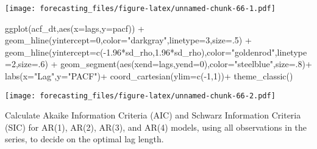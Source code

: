 \documentclass[
  oneside]{book}
\newenvironment{Shaded}{\begin{snugshade}}{\end{snugshade}}
\newcommand{\AttributeTok}[1]{\textcolor[rgb]{0.77,0.63,0.00}{#1}}
\newcommand{\DecValTok}[1]{\textcolor[rgb]{0.00,0.00,0.81}{#1}}
\newcommand{\FloatTok}[1]{\textcolor[rgb]{0.00,0.00,0.81}{#1}}
\newcommand{\FunctionTok}[1]{\textcolor[rgb]{0.00,0.00,0.00}{#1}}
\newcommand{\NormalTok}[1]{#1}
\newcommand{\SpecialCharTok}[1]{\textcolor[rgb]{0.00,0.00,0.00}{#1}}
\newcommand{\StringTok}[1]{\textcolor[rgb]{0.31,0.60,0.02}{#1}}
\begin{document}
\texttt{[image: forecasting\_files/figure-latex/unnamed-chunk-66-1.pdf]}

\begin{Shaded}
\begin{Highlighting}[]
\FunctionTok{ggplot}\NormalTok{(acf\_dt,}\FunctionTok{aes}\NormalTok{(}\AttributeTok{x=}\NormalTok{lags,}\AttributeTok{y=}\NormalTok{pacf)) }\SpecialCharTok{+}
  \FunctionTok{geom\_hline}\NormalTok{(}\AttributeTok{yintercept=}\DecValTok{0}\NormalTok{,}\AttributeTok{color=}\StringTok{"darkgray"}\NormalTok{,}\AttributeTok{linetype=}\DecValTok{3}\NormalTok{,}\AttributeTok{size=}\NormalTok{.}\DecValTok{5}\NormalTok{) }\SpecialCharTok{+}
  \FunctionTok{geom\_hline}\NormalTok{(}\AttributeTok{yintercept=}\FunctionTok{c}\NormalTok{(}\SpecialCharTok{{-}}\FloatTok{1.96}\SpecialCharTok{*}\NormalTok{sd\_rho,}\FloatTok{1.96}\SpecialCharTok{*}\NormalTok{sd\_rho),}\AttributeTok{color=}\StringTok{"goldenrod"}\NormalTok{,}\AttributeTok{linetype=}\DecValTok{2}\NormalTok{,}\AttributeTok{size=}\NormalTok{.}\DecValTok{6}\NormalTok{) }\SpecialCharTok{+}
  \FunctionTok{geom\_segment}\NormalTok{(}\FunctionTok{aes}\NormalTok{(}\AttributeTok{xend=}\NormalTok{lags,}\AttributeTok{yend=}\DecValTok{0}\NormalTok{),}\AttributeTok{color=}\StringTok{"steelblue"}\NormalTok{,}\AttributeTok{size=}\NormalTok{.}\DecValTok{8}\NormalTok{)}\SpecialCharTok{+}
  \FunctionTok{labs}\NormalTok{(}\AttributeTok{x=}\StringTok{"Lag"}\NormalTok{,}\AttributeTok{y=}\StringTok{"PACF"}\NormalTok{)}\SpecialCharTok{+}
  \FunctionTok{coord\_cartesian}\NormalTok{(}\AttributeTok{ylim=}\FunctionTok{c}\NormalTok{(}\SpecialCharTok{{-}}\DecValTok{1}\NormalTok{,}\DecValTok{1}\NormalTok{))}\SpecialCharTok{+}
  \FunctionTok{theme\_classic}\NormalTok{()}
\end{Highlighting}
\end{Shaded}

\texttt{[image: forecasting\_files/figure-latex/unnamed-chunk-66-2.pdf]}

Calculate Akaike Information Criteria (AIC) and Schwarz Information Criteria (SIC) for AR(1), AR(2), AR(3), and AR(4) models, using all observations in the series, to decide on the optimal lag length.
\end{document}
